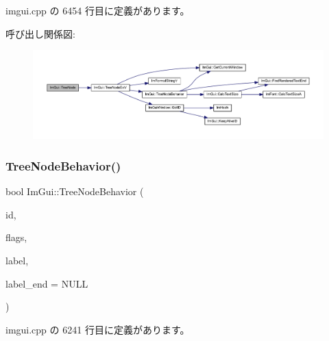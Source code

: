  imgui.\+cpp の 6454 行目に定義があります。

呼び出し関係図\+:\nopagebreak
\begin{figure}[H]
\begin{center}
\leavevmode
\includegraphics[width=350pt]{namespace_im_gui_a47f1421323f90fdd0a9cbfea2338b10f_cgraph}
\end{center}
\end{figure}
\mbox{\label{namespace_im_gui_a918eabf70d288e93b2519ee1eac2c0b4}} 
\subsubsection{\texorpdfstring{Tree\+Node\+Behavior()}{TreeNodeBehavior()}}
{\footnotesize\ttfamily bool Im\+Gui\+::\+Tree\+Node\+Behavior (\begin{DoxyParamCaption}\item[{\mbox{\hyperlink{imgui_8h_a1785c9b6f4e16406764a85f32582236f}{Im\+Gui\+ID}}}]{id,  }\item[{\mbox{\hyperlink{imgui_8h_a0588fdd10c59b49a0159484fe9ec4564}{Im\+Gui\+Tree\+Node\+Flags}}}]{flags,  }\item[{const char $\ast$}]{label,  }\item[{const char $\ast$}]{label\+\_\+end = {\ttfamily NULL} }\end{DoxyParamCaption})}



 imgui.\+cpp の 6241 行目に定義があります。

